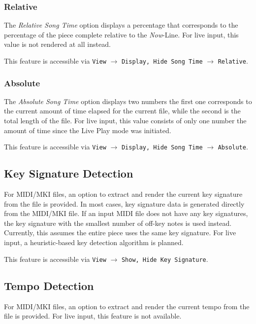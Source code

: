 \documentclass[english]{article}
\providecommand{\mi}[1]{\texttt{#1}}
\begin{document}
\subsubsection{Relative}

The \textit{Relative Song Time} option displays a percentage that corresponds to the percentage of the piece
complete relative to the \textit{Now}-Line. For live input, this value is not rendered at all instead.

This feature is accessible via 
\mi{View} $\rightarrow$ \mi{{Display, Hide} Song Time} $\rightarrow$ \mi{Relative}.

\subsubsection{Absolute}

The \textit{Absolute Song Time} option displays two numbers \textendash{} the first one corresponds to the 
current amount of time elapsed for the current file, while the second is the total length of the file.
For live input, this value consists of only one number \textendash{}
the amount of time since the Live Play mode was initiated.

This feature is accessible via 
\mi{View} $\rightarrow$ \mi{{Display, Hide} Song Time} $\rightarrow$ \mi{Absolute}.

\subsection{Key Signature Detection}

For MIDI/MKI files, an option to extract and render the current key signature from the file is provided. In most cases,
key signature data is generated directly from the MIDI/MKI file.
If an input MIDI file does not have any key signatures, the key signature with the smallest number of off-key notes
is used instead. Currently, this assumes the entire piece uses the same key signature. 
For live input, a heuristic-based key detection algorithm is planned.

This feature is accessible via 
\mi{View} $\rightarrow$ \mi{{Show, Hide} Key Signature}.

\subsection{Tempo Detection}

For MIDI/MKI files, an option to extract and render the current tempo from the file is provided. For live input,
this feature is not available.
\end{document}
